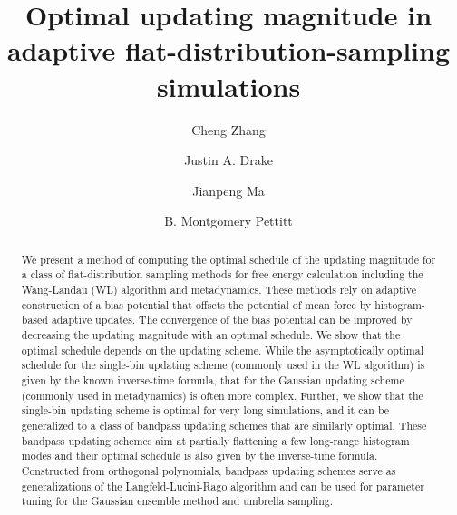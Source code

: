 \documentclass[reprint, superscriptaddress, floatfix]{revtex4-1}
\begin{document}
\title{Optimal updating magnitude in adaptive flat-distribution-sampling simulations}

\author{Cheng Zhang}
\author{Justin A. Drake}
\author{Jianpeng Ma}
\author{B. Montgomery Pettitt}



\begin{abstract}
  We present a method of computing the optimal schedule
  of the updating magnitude
  for a class of flat-distribution sampling methods
  for free energy calculation including
  the Wang-Landau (WL) algorithm and metadynamics.
  These methods rely on adaptive construction of
  a bias potential that offsets
  the potential of mean force by histogram-based adaptive updates.
  The convergence of the bias potential can be improved
  by decreasing the updating magnitude with an optimal schedule.
  We show that
  the optimal schedule depends on the updating scheme.
  While the asymptotically optimal schedule for
  the single-bin updating scheme (commonly used in the WL algorithm)
  is given by the known inverse-time formula,
  that for the Gaussian updating scheme (commonly used in metadynamics)
  is often more complex.
  Further,
  we show that the single-bin updating scheme
  is optimal for very long simulations,
  and it can be generalized to a class of bandpass updating schemes
  that are similarly optimal.
  These bandpass updating schemes aim at
  partially flattening a few long-range histogram modes
  and their optimal schedule
  is also given by the inverse-time formula.
  Constructed from orthogonal polynomials,
  bandpass updating schemes serve as generalizations
  of the Langfeld-Lucini-Rago algorithm
  and can be used for parameter tuning for the Gaussian ensemble method
  and umbrella sampling.
\end{abstract}

\maketitle
\end{document}

